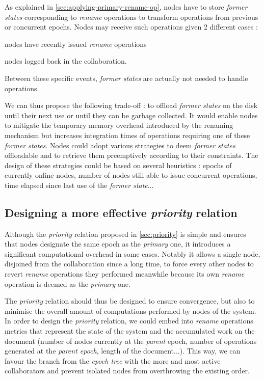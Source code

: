 \documentclass[10pt,journal,compsoc]{IEEEtran}
\begin{document}
As explained in \autoref{sec:applying-primary-rename-op}, nodes have to store \emph{former states} corresponding to \emph{rename} operations to transform operations from previous or concurrent epochs.
Nodes may receive such operations given 2 different cases :
\begin{enumerate*}[label=(\roman*)]
    \item nodes have recently issued \emph{rename} operations
    \item nodes logged back in the collaboration.
\end{enumerate*}
Between these specific events, \emph{former states} are actually not needed to handle operations.

We can thus propose the following trade-off : to offload \emph{former states} on the disk until their next use or until they can be garbage collected.
It would enable nodes to mitigate the temporary memory overhead introduced by the renaming mechanism but increases integration times of operations requiring one of these \emph{former states}.
Nodes could adopt various strategies to deem \emph{former states} offloadable and to retrieve them preemptively according to their constraints.
The design of these strategies could be based on several heuristics : epochs of currently online nodes, number of nodes still able to issue concurrent operations, time elapsed since last use of the \emph{former state}...

\subsection{Designing a more effective \emph{priority} relation}
\label{sec:designing-more-effective-priority-relation}

Although the \emph{priority} relation proposed in \autoref{sec:priority} is simple and ensures that nodes designate the same epoch as the \emph{primary} one, it introduces a significant computational overhead in some cases.
Notably it allows a single node, disjoined from the collaboration since a long time, to force every other nodes to revert \emph{rename} operations they performed meanwhile because its own \emph{rename} operation is deemed as the \emph{primary} one.

The \emph{priority} relation should thus be designed to ensure convergence, but also to minimise the overall amount of computations performed by nodes of the system.
In order to design the \emph{priority} relation, we could embed into \emph{rename} operations metrics that represent the state of the system and the accumulated work on the document (number of nodes currently at the \emph{parent} epoch, number of operations generated at the \emph{parent epoch}, length of the document...).
This way, we can favour the branch from the \emph{epoch tree} with the more and most active collaborators and prevent isolated nodes from overthrowing the existing order.
\end{document}
